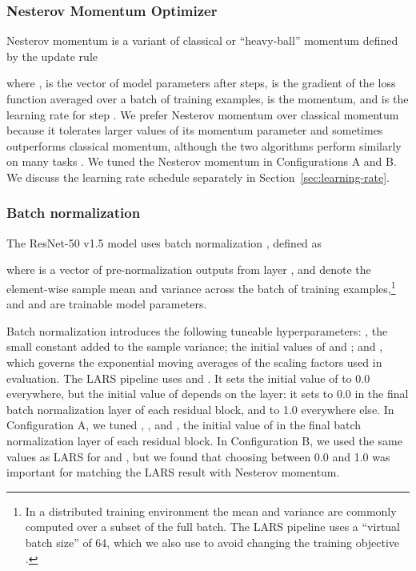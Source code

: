 \documentclass{article}
\begin{document}
\subsubsection{Nesterov Momentum Optimizer}\label{sec:nesterov-momentum}

Nesterov momentum is a variant of classical or ``heavy-ball'' momentum defined by the update rule
\newcommand{\loss}{\ell}
\newcommand{\grad}{\nabla}

where ,  is the vector of model parameters after  steps,  is the gradient of the loss function  averaged over a batch of training examples,  is the momentum, and  is the learning rate for step . We prefer Nesterov momentum over classical momentum because it tolerates larger values of its momentum parameter \citep{sutskever2013importance} and sometimes outperforms classical momentum, although the two algorithms perform similarly on many tasks \citep{shallue2019measuring,choi2019empirical}.
We tuned the Nesterov momentum  in Configurations A and B. We discuss the learning rate schedule  separately in Section~\ref{sec:learning-rate}.

\subsubsection{Batch normalization}\label{sec:batch-norm}

The ResNet-50 v1.5 model uses batch normalization \citep{ioffe2015batch}, defined as

where  is a vector of pre-normalization outputs from layer ,  and  denote the element-wise sample mean and variance across the batch of training examples,\footnote{In a distributed training environment the mean and variance are commonly computed over a subset of the full batch. The LARS pipeline uses a ``virtual batch size'' of 64, which we also use to avoid changing the training objective \citep{hoffer2017train}.} and  and  are trainable model parameters.

Batch normalization introduces the following tuneable hyperparameters: , the small constant added to the sample variance; the initial values of  and ; and , which governs the exponential moving averages of the scaling factors used in evaluation. The LARS pipeline uses  and . It sets the initial value of  to 0.0 everywhere, but the initial value of  depends on the layer: it sets  to 0.0 in the final batch normalization layer of each residual block, and to 1.0 everywhere else. In Configuration A, we tuned , , and , the initial value of  in the final batch normalization layer of each residual block. In Configuration B, we used the same values as LARS for  and , but we found that choosing  between 0.0 and 1.0 was important for matching the LARS result with Nesterov momentum.
\end{document}
